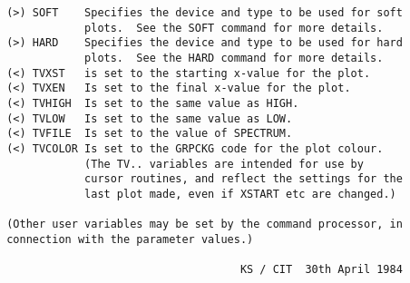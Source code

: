 \begin{description}
\begin{verbatim}
 (>) SOFT    Specifies the device and type to be used for soft
             plots.  See the SOFT command for more details.
 (>) HARD    Specifies the device and type to be used for hard
             plots.  See the HARD command for more details.
 (<) TVXST   is set to the starting x-value for the plot.
 (<) TVXEN   Is set to the final x-value for the plot.
 (<) TVHIGH  Is set to the same value as HIGH.
 (<) TVLOW   Is set to the same value as LOW.
 (<) TVFILE  Is set to the value of SPECTRUM.
 (<) TVCOLOR Is set to the GRPCKG code for the plot colour.
             (The TV.. variables are intended for use by
             cursor routines, and reflect the settings for the
             last plot made, even if XSTART etc are changed.)

 (Other user variables may be set by the command processor, in
 connection with the parameter values.)

                                     KS / CIT  30th April 1984
\end{verbatim}
\end{description}
